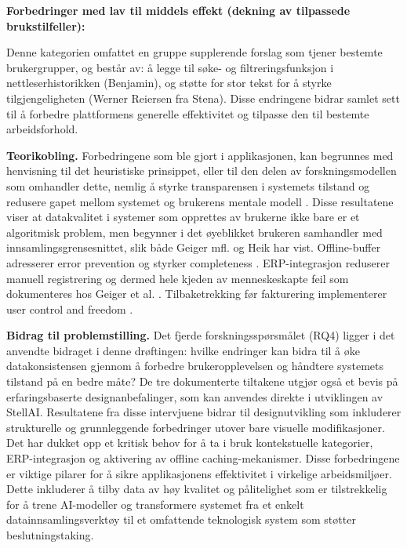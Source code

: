 \textbf{Forbedringer med lav til middels effekt (dekning av tilpassede brukstilfeller):}

Denne kategorien omfattet en gruppe supplerende forslag som tjener bestemte brukergrupper, og består av: å legge til søke- og filtreringsfunksjon i nettleserhistorikken (Benjamin), og støtte for stor tekst for å styrke tilgjengeligheten (Werner Reiersen fra Stena). Disse endringene bidrar samlet sett til å forbedre plattformens generelle effektivitet og tilpasse den til bestemte arbeidsforhold.


\textbf{Teorikobling.} Forbedringene som ble gjort i applikasjonen, kan begrunnes med henvisning til det heuristiske prinsippet, eller til den delen av forskningsmodellen som omhandler dette, nemlig å styrke transparensen i systemets tilstand \cite{nielsen1994} og redusere gapet mellom systemet og brukerens mentale modell \cite{norman2013}. Disse resultatene viser at datakvalitet i systemer som opprettes av brukerne ikke bare er et algoritmisk problem, men begynner i det øyeblikket brukeren samhandler med innsamlingsgrensesnittet, slik både Geiger mfl. \cite{geiger2021} og Heik \cite{heck2025} har vist.
Offline-buffer adresserer error prevention \cite{nielsen1994} og styrker completeness \cite{wang1996}. ERP-integrasjon reduserer manuell registrering og dermed hele kjeden av menneskeskapte feil som dokumenteres hos Geiger et al. \cite{geiger2021}. Tilbaketrekking før fakturering implementerer user control and freedom \cite{nielsen1994}.


\textbf{Bidrag til problemstilling.} Det fjerde forskningsspørsmålet (RQ4) ligger i det anvendte bidraget i denne drøftingen: hvilke endringer kan bidra til å øke datakonsistensen gjennom å forbedre brukeropplevelsen og håndtere systemets tilstand på en bedre måte? De tre dokumenterte tiltakene utgjør også et bevis på erfaringsbaserte designanbefalinger, som kan anvendes direkte i utviklingen av StellAI.
\newline Resultatene fra disse intervjuene bidrar til designutvikling som inkluderer strukturelle og grunnleggende forbedringer utover bare visuelle modifikasjoner. Det har dukket opp et kritisk behov for å ta i bruk kontekstuelle kategorier, ERP-integrasjon og aktivering av offline caching-mekanismer. Disse forbedringene er viktige pilarer for å sikre applikasjonens effektivitet i virkelige arbeidsmiljøer. Dette inkluderer å tilby data av høy kvalitet og pålitelighet som er tilstrekkelig for å trene AI-modeller og transformere systemet fra et enkelt datainnsamlingsverktøy til et omfattende teknologisk system som støtter beslutningstaking.


